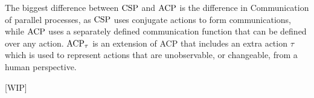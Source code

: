 \documentclass[../hons_project.tex]{subfiles}
\begin{document}
The biggest difference between $\mathrm{CSP}$ and $\mathrm{ACP}$ is the difference in Communication of parallel processes, as $\mathrm{CSP}$ uses conjugate actions to form communications, while $\mathrm{ACP}$ uses a separately defined communication function that can be defined over any action. $\mathrm{ACP}_{\tau}$ \citep{bergstraACPtUniversalAxiom1989} is an extension of ACP that includes an extra action $\tau$ which is used to represent actions that are unobservable, or changeable, from a human perspective.



{\huge [WIP]}
\end{document}
